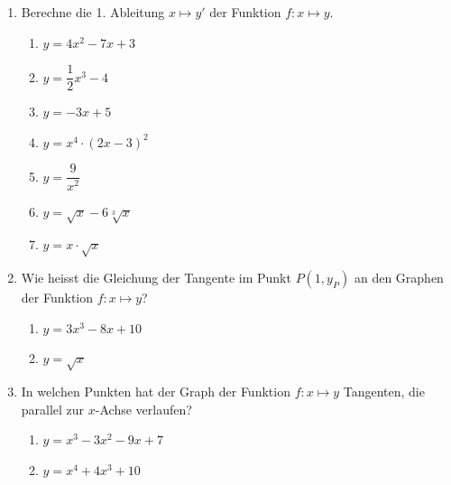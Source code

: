 \begin{ueb}
	{}{}
	\begin{enumerate}
		\item Berechne die 1. Ableitung \( x \mapsto y' \) der Funktion \( f \colon x \mapsto y \).
		      \begin{enumerate}
			      \item \( y = 4x^2 - 7x + 3 \)
			      \item \( y = \dfrac{1}{2}x^3 - 4 \)
			      \item $ y = -3x+5$
			      \item \( y = x^4 \cdot (2x - 3)^2 \)
			      \item \( y = \dfrac{9}{x^2} \)
			      \item \( y = \sqrt{x} - 6\sqrt[3]{x} \)
			      \item $y= x\cdot \sqrt{x}$

		      \end{enumerate}

		\item Wie heisst die Gleichung der Tangente im Punkt \( P(1, y_P) \) an den Graphen der Funktion \( f \colon x \mapsto y \)?
		      \begin{enumerate}
			      \item \( y = 3x^3 - 8x + 10 \)
			      \item  $ y= \sqrt{x}$
		      \end{enumerate}

		\item In welchen Punkten hat der Graph der Funktion \( f \colon x \mapsto y \) Tangenten, die parallel zur \( x \)-Achse verlaufen?
		      \begin{enumerate}
			      \item \( y = x^3 - 3x^2 - 9x + 7 \)
			      \item \( y = x^4 + 4x^3 + 10 \)
		      \end{enumerate}


\end{enumerate}
\end{ueb}
